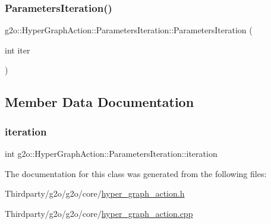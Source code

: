 \subsubsection{\texorpdfstring{Parameters\+Iteration()}{ParametersIteration()}}
{\footnotesize\ttfamily g2o\+::\+Hyper\+Graph\+Action\+::\+Parameters\+Iteration\+::\+Parameters\+Iteration (\begin{DoxyParamCaption}\item[{int}]{iter }\end{DoxyParamCaption})\hspace{0.3cm}{\ttfamily [explicit]}}



\subsection{Member Data Documentation}
\mbox{\label{classg2o_1_1_hyper_graph_action_1_1_parameters_iteration_a6ec1e8c9333e75e9531bebe055e23ce2}} 
\subsubsection{\texorpdfstring{iteration}{iteration}}
{\footnotesize\ttfamily int g2o\+::\+Hyper\+Graph\+Action\+::\+Parameters\+Iteration\+::iteration}



The documentation for this class was generated from the following files\+:\begin{DoxyCompactItemize}
\item 
Thirdparty/g2o/g2o/core/\mbox{\hyperlink{hyper__graph__action_8h}{hyper\+\_\+graph\+\_\+action.\+h}}\item 
Thirdparty/g2o/g2o/core/\mbox{\hyperlink{hyper__graph__action_8cpp}{hyper\+\_\+graph\+\_\+action.\+cpp}}\end{DoxyCompactItemize}
